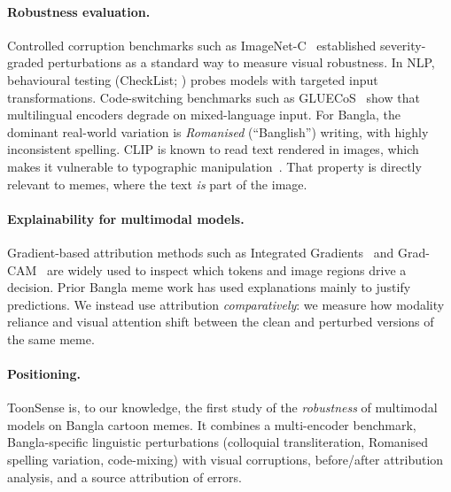 \paragraph{Robustness evaluation.}
Controlled corruption benchmarks such as ImageNet-C~\cite{hendrycks2019benchmarking} established severity-graded
perturbations as a standard way to measure visual robustness. In NLP, behavioural testing (CheckList;
\cite{ribeiro2020checklist}) probes models with targeted input transformations. Code-switching benchmarks such as
GLUECoS~\cite{khanuja2020gluecos} show that multilingual encoders degrade on mixed-language input. For Bangla, the
dominant real-world variation is \emph{Romanised} (``Banglish'') writing, with highly inconsistent spelling. CLIP is
known to read text rendered in images, which makes it vulnerable to typographic manipulation~\cite{goh2021multimodal}.
That property is directly relevant to memes, where the text \emph{is} part of the image.

\paragraph{Explainability for multimodal models.}
Gradient-based attribution methods such as Integrated Gradients~\cite{sundararajan2017ig} and
Grad-CAM~\cite{selvaraju2017gradcam,chattopadhay2018gradcampp} are widely used to inspect which tokens and image
regions drive a decision. Prior Bangla meme work has used explanations mainly to justify predictions. We instead use
attribution \emph{comparatively}: we measure how modality reliance and visual attention shift between the clean and
perturbed versions of the same meme.

\paragraph{Positioning.}
ToonSense is, to our knowledge, the first study of the \emph{robustness} of multimodal models on Bangla cartoon
memes. It combines a multi-encoder benchmark, Bangla-specific linguistic perturbations (colloquial transliteration,
Romanised spelling variation, code-mixing) with visual corruptions, before/after attribution analysis, and a source
attribution of errors.
